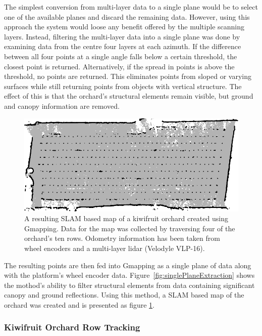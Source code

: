 \documentclass[preprint,authoryear,12pt]{elsarticle}
\begin{document}
        The simplest conversion from multi-layer data to a single plane would be to select one of the available planes and discard the remaining data.
        However, using this approach the system would loose any benefit offered by the multiple scanning layers.
        Instead, filtering the multi-layer data into a single plane was done by examining data from the centre four layers at each azimuth.
        If the difference between all four points at a single angle falls below a certain threshold, the closest point is returned.
        Alternatively, if the spread in points is above the threshold, no points are returned.
        This eliminates points from sloped or varying surfaces while still returning points from objects with vertical structure.
        The effect of this is that the orchard's structural elements remain visible, but ground and canopy information are removed.

        \begin{figure}[htb]
            \centering
            \includegraphics{imgs/gmapmap/gmapmap.pdf}
            \caption{
                A resulting SLAM based map of a kiwifruit orchard created using Gmapping.
                Data for the map was collected by traversing four of the orchard's ten rows.
                Odometry information has been taken from wheel encoders and a multi-layer lidar (Velodyle VLP-16).
            }
            \label{fig:gmapmap}
        \end{figure}

        The resulting points are then fed into Gmapping as a single plane of data along with the platform's wheel encoder data.
        Figure~\ref{fig:singlePlaneExtraction} shows the mothod's ability to filter structural elements from data containing significant canopy and ground reflections.
        Using this method, a SLAM based map of the orchard was created and is presented as figure \ref{fig:gmapmap}.


    \subsubsection{Kiwifruit Orchard Row Tracking}
        \label{sect:row_tracking}
\end{document}
